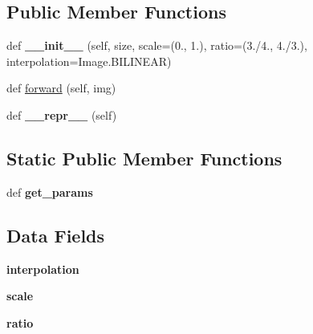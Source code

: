 \subsection*{Public Member Functions}
\begin{DoxyCompactItemize}
\item 
\mbox{\label{classtorchvision_1_1transforms_1_1transforms_1_1RandomResizedCrop_a558352fb57bdc9d17803217c07e0def8}} 
def {\bfseries \+\_\+\+\_\+init\+\_\+\+\_\+} (self, size, scale=(0., 1.), ratio=(3./4., 4./3.), interpolation=Image.\+B\+I\+L\+I\+N\+E\+AR)
\item 
def \hyperlink{classtorchvision_1_1transforms_1_1transforms_1_1RandomResizedCrop_a6bb0af34e1a9242416c17831b2b3ef69}{forward} (self, img)
\item 
\mbox{\label{classtorchvision_1_1transforms_1_1transforms_1_1RandomResizedCrop_add931bee0aa866fb8ca5fb36e70994f1}} 
def {\bfseries \+\_\+\+\_\+repr\+\_\+\+\_\+} (self)
\end{DoxyCompactItemize}
\subsection*{Static Public Member Functions}
\begin{DoxyCompactItemize}
\item 
\mbox{\label{classtorchvision_1_1transforms_1_1transforms_1_1RandomResizedCrop_a1edd63302869aa78f10ff64c5c915626}} 
def {\bfseries get\+\_\+params}
\end{DoxyCompactItemize}
\subsection*{Data Fields}
\begin{DoxyCompactItemize}
\item 
\mbox{\label{classtorchvision_1_1transforms_1_1transforms_1_1RandomResizedCrop_a45ed6e5637f741db099dfc56d8c06d10}} 
{\bfseries interpolation}
\item 
\mbox{\label{classtorchvision_1_1transforms_1_1transforms_1_1RandomResizedCrop_a9aae32f1cf35df8ab085f3be81af793a}} 
{\bfseries scale}
\item 
\mbox{\label{classtorchvision_1_1transforms_1_1transforms_1_1RandomResizedCrop_ae2824ea04bf019e5700e4c76e4d5b248}} 
{\bfseries ratio}
\end{DoxyCompactItemize}
